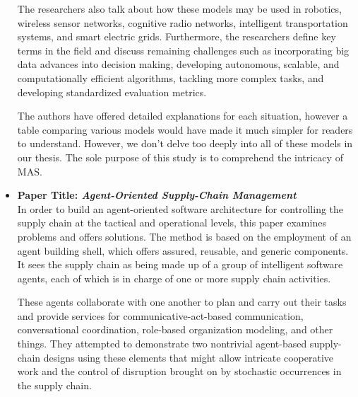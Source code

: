 \begin{itemize}[label={}]
\vspace{.5cm}

The researchers also talk about how these models may be used in robotics, wireless sensor networks, cognitive radio networks, intelligent transportation systems, and smart electric grids. Furthermore, the researchers define key terms in the field and discuss remaining challenges such as incorporating big data advances into decision making, developing autonomous, scalable, and computationally efficient algorithms, tackling more complex tasks, and developing standardized evaluation metrics.

\vspace{.5cm}
The authors have offered detailed explanations for each situation, however a table comparing various models would have made it much simpler for readers to understand. However, we don't delve too deeply into all of these models in our thesis. The sole purpose of this study is to comprehend the intricacy of \ac{MAS}.
\vspace{.5cm}

\item \textbf{Paper Title: \textit{Agent-Oriented Supply-Chain Management}} \\

In order to build an agent-oriented software architecture for controlling the supply chain at the tactical and operational levels, this paper \cite{agSupch} examines problems and offers solutions. The method is based on the employment of an agent building shell, which offers assured, reusable, and generic components. It sees the supply chain as being made up of a group of intelligent software agents, each of which is in charge of one or more supply chain activities. 

\vspace{.5cm}

These agents collaborate with one another to plan and carry out their tasks and provide services for communicative-act-based communication, conversational coordination, role-based organization modeling, and other things. They attempted to demonstrate two nontrivial agent-based supply-chain designs using these elements that might allow intricate cooperative work and the control of disruption brought on by stochastic occurrences in the supply chain.

\vspace{.5cm}


\end{itemize}
